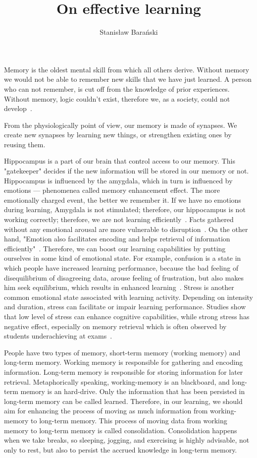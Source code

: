 \documentclass{article}
\title{On effective learning}
\author{Stanisław Barański}
\begin{document}
\maketitle

Memory is the oldest mental skill from which all others derive. Without memory we would not be able to remember new skills that we have just learned. A person who can not remember, is cut off from the knowledge of prior experiences. Without memory, logic couldn't exist, therefore we, as a society, could not develop~\cite{csikszentmihalyi1990flow}.

From the physiologically point of view, our memory is made of synapses. We create new synapses by learning new things, or strengthen existing ones by reusing them.

Hippocampus is a part of our brain that control access to our memory. This "gatekeeper" decides if the new information will be stored in our memory or not. Hippocampus is influenced by the amygdala, which in turn is influenced by emotions — phenomenea called memory enhancement effect. The more emotionally charged event, the better we remember it. If we have no emotions during learning, Amygdala is not stimulated; therefore, our hippocampus is not working correctly; therefore, we are not learning efficiently~\cite{phelps2004human, tyng2017influences}. Facts gathered without any emotional arousal are more vulnerable to disruption~\cite{doi:10.1111/1467-9280.00090}. On the other hand, "Emotion also facilitates encoding and helps retrieval of information efficiently"~\cite{tyng2017influences}. Therefore, we can boost our learning capabilities by putting ourselves in some kind of emotional state. For example, confusion is a state in which people have increased learning performance, because the bad feeling of disequilibrium of disagreeing data, arouse feeling of frustration, but also makes him seek equilibrium, which results in enhanced learning~\cite{d2014confusion}. Stress is another common emotional state associated with learning activity. Depending on intensity and duration, stress can facilitate or impair learning performance. Studies show that low level of stress can enhance cognitive capabilities, while strong stress has negative effect, especially on memory retrieval which is often observed by students underachieving at exams~\cite{vogel2016learning}.

People have two types of memory, short-term memory (working memory) and long-term memory. Working memory is responsible for gathering and encoding information. Long-term memory is responsible for storing information for later retrieval. Metaphorically speaking, working-memory is an blackboard, and long-term memory is an hard-drive. Only the information that has been persisted in long-term memory can be called learned. Therefore, in our learning, we should aim for enhancing the process of moving as much information from working-memory to long-term memory. This process of moving data from working memory to long-term memory is called consolidation. Consolidation happens when we take breaks, so sleeping, jogging, and exercising is highly advisable, not only to rest, but also to persist the accrued knowledge in long-term memory.
\end{document}

